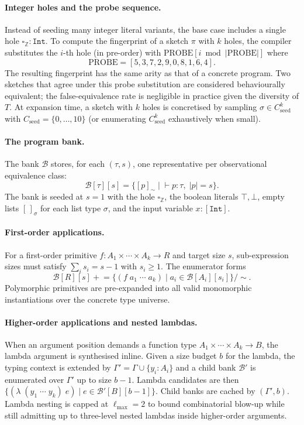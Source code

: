 \documentclass[12pt]{article}
\begin{document}
\paragraph{Integer holes and the probe sequence.} Instead of seeding many integer literal variants, the base case includes a single hole $\square_{\mathbb{Z}}:\texttt{Int}$. To compute the fingerprint of a sketch $\pi$ with $k$ holes, the compiler substitutes the $i$-th hole (in pre-order) with $\mathrm{PROBE}[i \bmod |\mathrm{PROBE}|]$ where
\[
  \mathrm{PROBE} = [5, 3, 7, 2, 9, 0, 8, 1, 6, 4].
\]
The resulting fingerprint has the same arity as that of a concrete program. Two sketches that agree under this probe substitution are considered behaviourally equivalent; the false-equivalence rate is negligible in practice given the diversity of $T$. At expansion time, a sketch with $k$ holes is concretised by sampling $\sigma \in C_{\mathrm{seed}}^k$ with $C_{\mathrm{seed}} = \{0,\ldots,10\}$ (or enumerating $C_{\mathrm{seed}}^k$ exhaustively when small).

\paragraph{The program bank.} The bank $\mathcal{B}$ stores, for each $(\tau, s)$, one representative per observational equivalence class:
\[
  \mathcal{B}[\tau][s] = \bigl\{[p]_\sim \;\big|\; \vdash p : \tau,\; |p| = s\bigr\}.
\]
The bank is seeded at $s = 1$ with the hole $\square_{\mathbb{Z}}$, the boolean literals $\top, \bot$, empty lists $[\,]_\sigma$ for each list type $\sigma$, and the input variable $x:[\texttt{Int}]$.

\paragraph{First-order applications.} For a first-order primitive $f:A_1 \times \cdots \times A_k \to R$ and target size $s$, sub-expression sizes must satisfy $\sum_i s_i = s-1$ with $s_i \geq 1$. The enumerator forms
\[
  \mathcal{B}[R][s] \mathrel{+}= \bigl\{ (f\;a_1\;\cdots\;a_k) \;\big|\; a_i \in \mathcal{B}[A_i][s_i] \bigr\} / \!\sim.
\]
Polymorphic primitives are pre-expanded into all valid monomorphic instantiations over the concrete type universe.

\paragraph{Higher-order applications and nested lambdas.} When an argument position demands a function type $A_1 \times \cdots \times A_k \to B$, the lambda argument is synthesised inline. Given a size budget $b$ for the lambda, the typing context is extended by $\Gamma' = \Gamma \cup \{y_i:A_i\}$ and a child bank $\mathcal{B}'$ is enumerated over $\Gamma'$ up to size $b - 1$. Lambda candidates are then $\{(\lambda\;(y_1\;\cdots\;y_k)\;e) \;|\; e \in \mathcal{B}'[B][b-1]\}$. Child banks are cached by $(\Gamma', b)$. Lambda nesting is capped at $\ell_{\max} = 2$ to bound combinatorial blow-up while still admitting up to three-level nested lambdas inside higher-order arguments.
\end{document}
